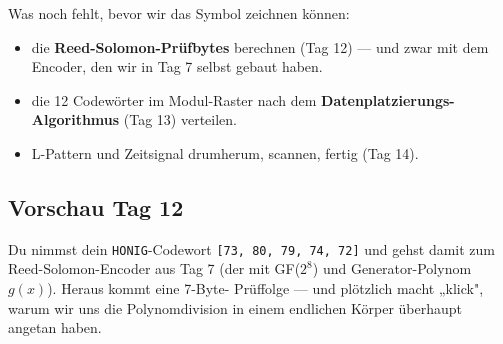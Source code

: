 Was noch fehlt, bevor wir das Symbol zeichnen können:

\begin{itemize}
\item die \textbf{Reed-Solomon-Prüfbytes} berechnen (Tag 12) — und
  zwar mit dem Encoder, den wir in Tag 7 selbst gebaut haben.
\item die 12 Codewörter im Modul-Raster nach dem
  \textbf{Datenplatzierungs-Algorithmus} (Tag 13) verteilen.
\item L-Pattern und Zeitsignal drumherum, scannen, fertig (Tag 14).
\end{itemize}

\subsection*{Vorschau Tag 12}

Du nimmst dein \texttt{HONIG}-Codewort \texttt{[73, 80, 79, 74, 72]}
und gehst damit zum Reed-Solomon-Encoder aus Tag 7 (der mit
GF($2^8$) und Generator-Polynom $g(x)$). Heraus kommt eine 7-Byte-
Prüffolge — und plötzlich macht „klick", warum wir uns die
Polynomdivision in einem endlichen Körper überhaupt angetan haben.
